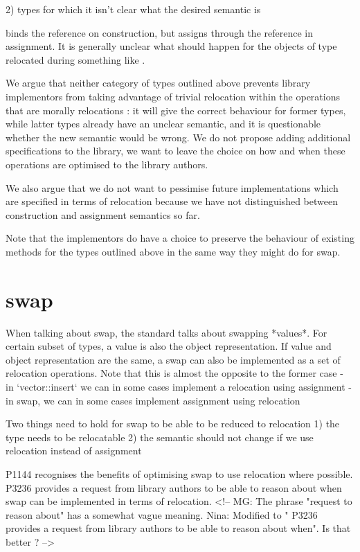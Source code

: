 \documentclass{wg21}
\begin{document}
2) types for which it isn't clear what the desired semantic is

 binds the reference on construction, but assigns through the reference in assignment. It is generally unclear what should happen for the objects of type  relocated during something like .

We argue that neither category of types outlined above prevents library implementors from taking advantage of trivial relocation within the operations that are morally relocations : it will give the correct behaviour for former types, while latter types already have an unclear semantic, and it is questionable whether the new semantic would be wrong. We do not propose adding additional specifications to the library, we want to leave the choice on how and when these operations are optimised to the library authors.

We also argue that we do not want to pessimise future implementations which are specified in terms of relocation because we have not distinguished between construction and assignment semantics so far.

Note that the implementors do have a choice to preserve the behaviour of existing methods for the types outlined above in the same way they might do for swap.

\section{swap}

When talking about swap, the standard talks about swapping *values*. For certain subset of types, a value is also the object representation. If value and object representation are the same, a swap can also be implemented as a set of relocation operations. Note that this is almost the opposite to the former case
- in `vector::insert` we can in some cases implement a relocation using assignment
- in swap, we can in some cases implement assignment using relocation


Two things need to hold for swap to be able to be reduced to relocation
1) the type needs to be relocatable
2) the semantic should not change if we use relocation instead of assignment

P1144 recognises the benefits of optimising swap to use relocation where possible. P3236 provides a request from library authors to be able to reason about when swap can be implemented in terms of relocation.
<!-- MG: The phrase "request to reason about" has a somewhat vague meaning.
     Nina: Modified to " P3236 provides a request from library authors to be able to reason about when". Is that better ? -->
\end{document}
